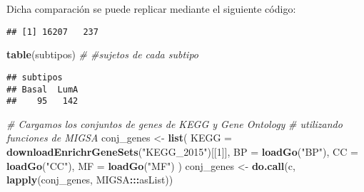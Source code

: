\documentclass[12pt,twoside]{reedthesis}
\newenvironment{Shaded}{\begin{snugshade}}{\end{snugshade}}
\newcommand{\CommentTok}[1]{\textcolor[rgb]{0.56,0.35,0.01}{\textit{#1}}}
\newcommand{\DataTypeTok}[1]{\textcolor[rgb]{0.13,0.29,0.53}{#1}}
\newcommand{\DecValTok}[1]{\textcolor[rgb]{0.00,0.00,0.81}{#1}}
\newcommand{\KeywordTok}[1]{\textcolor[rgb]{0.13,0.29,0.53}{\textbf{#1}}}
\newcommand{\NormalTok}[1]{#1}
\newcommand{\OperatorTok}[1]{\textcolor[rgb]{0.81,0.36,0.00}{\textbf{#1}}}
\newcommand{\StringTok}[1]{\textcolor[rgb]{0.31,0.60,0.02}{#1}}
\begin{document}
Dicha comparación se puede replicar mediante el siguiente código:
\begin{Shaded}
\end{Shaded}
\begin{verbatim}
## [1] 16207   237
\end{verbatim}
\begin{Shaded}
\begin{Highlighting}[]
\KeywordTok{table}\NormalTok{(subtipos) }\CommentTok{# #sujetos de cada subtipo}
\end{Highlighting}
\end{Shaded}
\begin{verbatim}
## subtipos
## Basal  LumA 
##    95   142
\end{verbatim}
\begin{Shaded}
\begin{Highlighting}[]
\CommentTok{# Cargamos los conjuntos de genes de KEGG y Gene Ontology}
\CommentTok{# utilizando funciones de MIGSA}
\NormalTok{conj_genes <-}\StringTok{ }\KeywordTok{list}\NormalTok{(}
  \DataTypeTok{KEGG =} \KeywordTok{downloadEnrichrGeneSets}\NormalTok{(}\StringTok{"KEGG_2015"}\NormalTok{)[[}\DecValTok{1}\NormalTok{]],}
  \DataTypeTok{BP =} \KeywordTok{loadGo}\NormalTok{(}\StringTok{"BP"}\NormalTok{),}
  \DataTypeTok{CC =} \KeywordTok{loadGo}\NormalTok{(}\StringTok{"CC"}\NormalTok{),}
  \DataTypeTok{MF =} \KeywordTok{loadGo}\NormalTok{(}\StringTok{"MF"}\NormalTok{)}
\NormalTok{)}
\NormalTok{conj_genes <-}\StringTok{ }\KeywordTok{do.call}\NormalTok{(c, }\KeywordTok{lapply}\NormalTok{(conj_genes, MIGSA}\OperatorTok{:::}\NormalTok{asList))}
\end{Highlighting}
\end{Shaded}
\begin{Shaded}
\end{Shaded}
\end{document}
